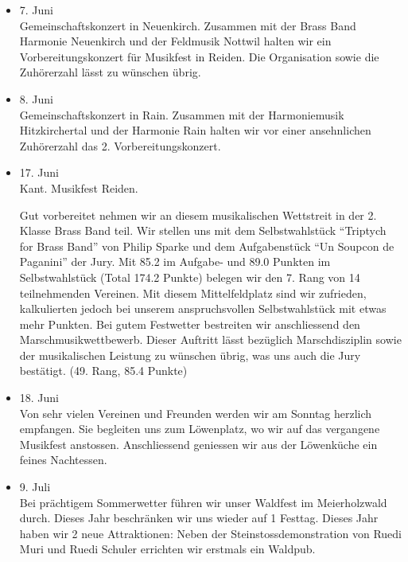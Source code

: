 \begin{history}
\begin{itemize}
        \item[]7. Juni\\
        Gemeinschaftskonzert in Neuenkirch. Zusammen mit der Brass Band Harmonie
        Neuenkirch und der Feldmusik Nottwil halten wir ein Vorbereitungskonzert
        für Musikfest in Reiden. Die Organisation sowie die Zuhörerzahl lässt zu
        wünschen übrig.

        \item[]8. Juni\\
        Gemeinschaftskonzert in Rain. Zusammen mit der Harmoniemusik
        Hitzkirchertal und der Harmonie Rain halten wir vor einer ansehnlichen
        Zuhörerzahl das 2. Vorbereitungskonzert.

        \item[]17. Juni\\
        Kant. Musikfest Reiden.

        Gut vorbereitet nehmen wir an diesem musikalischen Wettstreit in der 2.
        Klasse Brass Band teil. Wir stellen uns mit dem Selbstwahlstück
        \enquote{Triptych for Brass Band} von Philip Sparke und dem
        Aufgabenstück \enquote{Un Soupcon de Paganini} der Jury. Mit 85.2 im
        Aufgabe- und 89.0 Punkten im Selbstwahlstück (Total 174.2 Punkte)
        belegen wir den 7. Rang von 14 teilnehmenden Vereinen. Mit diesem
        Mittelfeldplatz sind wir zufrieden, kalkulierten jedoch bei unserem
        anspruchsvollen Selbstwahlstück mit etwas mehr Punkten. Bei gutem
        Festwetter bestreiten wir anschliessend den Marschmusikwettbewerb.
        Dieser Auftritt lässt bezüglich Marschdisziplin sowie der musikalischen
        Leistung zu wünschen übrig, was uns auch die Jury bestätigt. (49. Rang,
        85.4 Punkte)

        \item[]18. Juni\\
        Von sehr vielen Vereinen und Freunden werden wir am Sonntag herzlich
        empfangen. Sie begleiten uns zum Löwenplatz, wo wir auf das vergangene
        Musikfest anstossen. Anschliessend geniessen wir aus der Löwenküche ein
        feines Nachtessen.

        \item[]9. Juli\\
        Bei prächtigem Sommerwetter führen wir unser Waldfest im Meierholzwald
        durch. Dieses Jahr beschränken wir uns wieder auf 1 Festtag. Dieses Jahr
        haben wir 2 neue Attraktionen: Neben der Steinstossdemonstration von
        Ruedi Muri und Ruedi Schuler errichten wir erstmals ein Waldpub.


\end{itemize}
\end{history}
